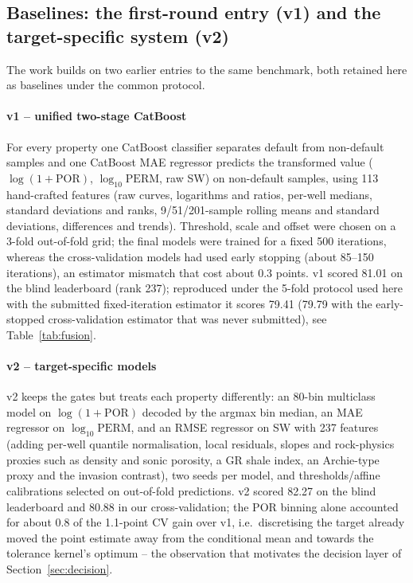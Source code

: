 \documentclass[preprint,12pt]{elsarticle}
\begin{document}
\subsection{Baselines: the first-round entry (v1) and the target-specific system (v2)}
\label{sec:baselines}

The work builds on two earlier entries to the same benchmark, both retained here as baselines under the common protocol.

\paragraph{v1 -- unified two-stage CatBoost} For every property one CatBoost \cite{prokhorenkova2018catboost} classifier separates default from non-default samples and one CatBoost MAE regressor predicts the transformed value ($\log(1+\mathrm{POR})$, $\log_{10}\mathrm{PERM}$, raw SW) on non-default samples, using 113 hand-crafted features (raw curves, logarithms and ratios, per-well medians, standard deviations and ranks, 9/51/201-sample rolling means and standard deviations, differences and trends). Threshold, scale and offset were chosen on a 3-fold out-of-fold grid; the final models were trained for a fixed 500 iterations, whereas the cross-validation models had used early stopping (about 85--150 iterations), an estimator mismatch that cost about 0.3 points. v1 scored 81.01 on the blind leaderboard (rank 237); reproduced under the 5-fold protocol used here with the submitted fixed-iteration estimator it scores 79.41 (79.79 with the early-stopped cross-validation estimator that was never submitted), see Table~\ref{tab:fusion}.

\paragraph{v2 -- target-specific models} v2 keeps the gates but treats each property differently: an 80-bin multiclass model on $\log(1+\mathrm{POR})$ decoded by the argmax bin median, an MAE regressor on $\log_{10}\mathrm{PERM}$, and an RMSE regressor on SW with 237 features (adding per-well quantile normalisation, local residuals, slopes and rock-physics proxies such as density and sonic porosity, a GR shale index, an Archie-type proxy and the invasion contrast), two seeds per model, and thresholds/affine calibrations selected on out-of-fold predictions. v2 scored 82.27 on the blind leaderboard and 80.88 in our cross-validation; the POR binning alone accounted for about 0.8 of the 1.1-point CV gain over v1, i.e.\ discretising the target already moved the point estimate away from the conditional mean and towards the tolerance kernel's optimum -- the observation that motivates the decision layer of Section~\ref{sec:decision}.
\end{document}
